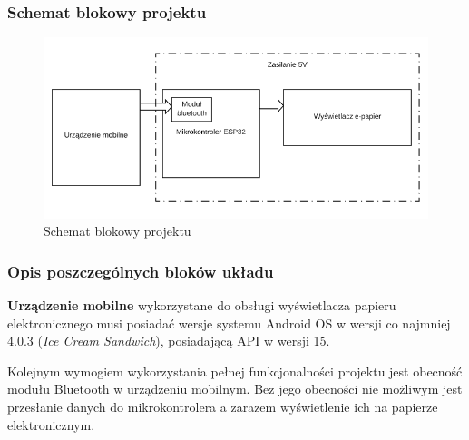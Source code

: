 \documentclass[a4paper,12pt, twoside]{article}
\begin{document}
        \subsubsection{Schemat blokowy projektu}
        \begin{figure}[H]
    	        \centering
    			\vspace{.5cm}
    			\includegraphics[width=14cm]{images/rys_7schemat_blokowy.png}
    			\vspace{.5cm}
    			\caption{Schemat blokowy projektu}
                \label{fig:block}
    	\end{figure}
    	\vspace{.5cm}
        \subsubsection{Opis poszczególnych bloków układu}
        \textbf{Urządzenie mobilne} wykorzystane do obsługi wyświetlacza papieru elektronicznego musi posiadać wersje systemu Android OS w wersji co najmniej 4.0.3 (\textit{Ice Cream Sandwich})\cite{ics}, posiadającą API w wersji 15\cite{api}. 
        
        Kolejnym wymogiem wykorzystania pełnej funkcjonalności projektu jest obecność modułu Bluetooth w urządzeniu mobilnym. Bez jego obecności nie możliwym jest przesłanie danych do mikrokontrolera a zarazem wyświetlenie ich na papierze elektronicznym.
        
        \vspace{1cm}
        
\end{document}
